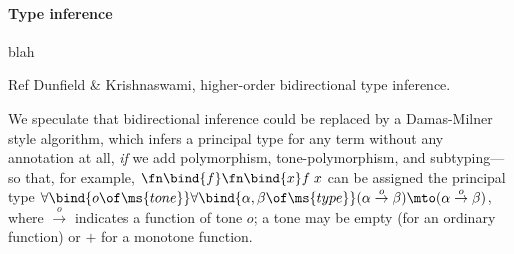 \paragraph{Type inference} blah

\TODO Ref Dunfield \& Krishnaswami, higher-order bidirectional type inference.

 We speculate that bidirectional inference could be replaced by a
Damas-Milner  style algorithm, which infers a principal type for any
term without any annotation at all, \emph{if} we add polymorphism,
tone-polymorphism, and subtyping---so that, for example, $\fn\bind{f}\fn\bind{x}
f\;x$ can be assigned the principal type
$\forall\bind{o\of\ms{tone}}\forall\bind{\alpha,\beta \of \ms{type}} (\alpha
\overset{o}\to \beta) \mto (\alpha \overset{o}\to \beta)$, where
$\overset{o}\to$ indicates a function of tone $o$; a tone may be empty (for an
ordinary function) or ${+}$ for a monotone function.
